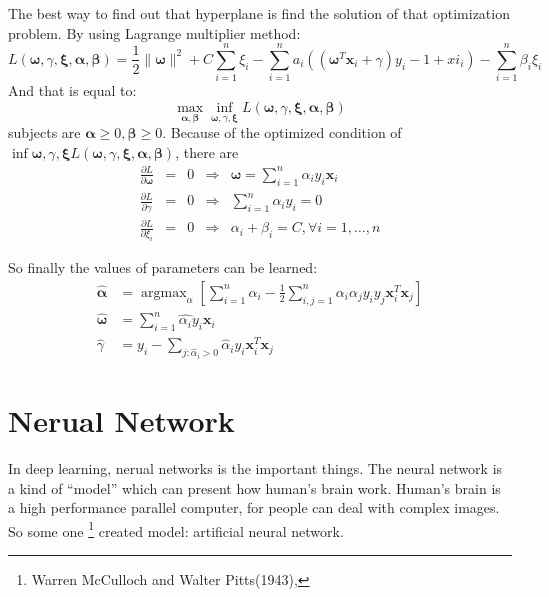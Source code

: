 \documentclass[twoside]{article}
\begin{document}
The best way to find out that hyperplane is find the solution of that optimization problem.
By using Lagrange multiplier method\cite{GraphML1}:
\begin{equation}
  \label{eq:lagrange-multiplier-method}
  L(\mathbf{\omega},\gamma,\mathbf{\xi},\mathbf{\alpha},\mathbf{\beta}) =
  \frac{1}{2}\parallel\mathbf{\omega}\parallel^2+C\sum\limits_{i=1}^{n}\xi_i
  - \sum\limits_{i=1}^{n}a_i\left(\left(\mathbf{\omega}^T\mathbf{x}_i+\gamma\right)y_i-1+
  xi_i\right) - \sum\limits_{i=1}^{n}\beta_i\xi_i
\end{equation}
And that is equal to:
\begin{equation}
\max\limits_{\mathbf{\alpha},\mathbf{\beta}}\inf\limits_{\mathbf{\omega},\gamma,\mathbf{\xi}}
 L(\mathbf{\omega},\gamma,\mathbf{\xi},\mathbf{\alpha},\mathbf{\beta})
\end{equation}
subjects are $\mathbf{\alpha} \geq 0,\mathbf{\beta} \geq 0$.
Because of the optimized condition of $\inf{\mathbf{\omega},\gamma,\mathbf{\xi}}
L(\mathbf{\omega},\gamma,\mathbf{\xi},\mathbf{\alpha},\mathbf{\beta})$,
there are
$$\begin{array}{ccccl}
\frac{\partial L}{\partial \mathbf{\omega}} & = & 0 & \Rightarrow & \mathbf{\omega} = \sum\limits_{i=1}^{n}\alpha_iy_i\mathbf{x}_i \\
\frac{\partial L}{\partial \gamma} & = & 0 & \Rightarrow & \sum\limits_{i=1}^{n}\alpha_iy_i = 0 \\
\frac{\partial L}{\partial \xi_i} & = & 0 & \Rightarrow & \alpha_i + \beta_i = C, \forall i=1,\dots,n
\end{array}
$$

So finally the values of parameters can be learned:
\begin{align}
\hat{\mathbf{\alpha}} &= \mathop{argmax}_\alpha\left[\sum\limits_{i=1}^{n}\alpha_i-\frac{1}{2}\sum\limits_{i,j=1}^{n}\alpha_i\alpha_jy_iy_j\mathbf{x}^T_i\mathbf{x}_j \right]
\\
\hat{\mathbf{\omega}} &= \sum\limits_{i=1}^{n}\hat{\alpha_i}y_i\mathbf{x}_i
\\
\hat{\gamma} &= y_i - \sum\limits_{j:\hat{\alpha}_i>0}\hat{\alpha}_iy_i\mathbf{x}_i^T\mathbf{x}_j
\end{align}


\section{Nerual Network}
\label{sec:nn}

In deep learning, nerual networks is the important things.
The neural network is a kind of ``model'' which can present how human's brain work.
Human's brain is a high performance parallel computer, for people can deal with complex images\cite{NNnML1}.
So some one%
\footnote{Warren McCulloch and Walter Pitts(1943),\cite{McCulloch194}}
created model: artificial neural network.
\end{document}
